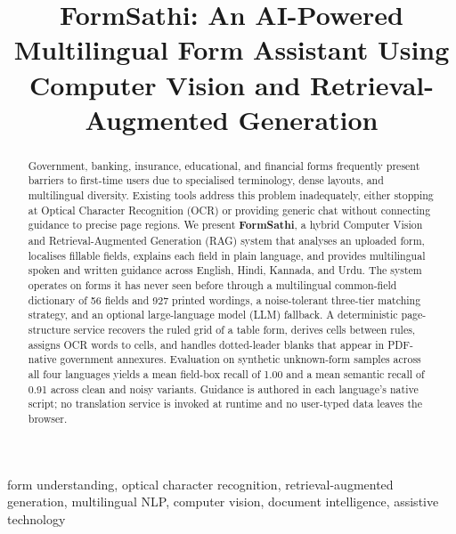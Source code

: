 \documentclass[conference]{IEEEtran}
\begin{document}
\title{FormSathi: An AI-Powered Multilingual Form Assistant Using Computer Vision and Retrieval-Augmented Generation}

\author{
}

\maketitle

\begin{abstract}
Government, banking, insurance, educational, and financial forms frequently present barriers to first-time users due to specialised terminology, dense layouts, and multilingual diversity. Existing tools address this problem inadequately, either stopping at Optical Character Recognition (OCR) or providing generic chat without connecting guidance to precise page regions. We present \textbf{FormSathi}, a hybrid Computer Vision and Retrieval-Augmented Generation (RAG) system that analyses an uploaded form, localises fillable fields, explains each field in plain language, and provides multilingual spoken and written guidance across English, Hindi, Kannada, and Urdu. The system operates on forms it has never seen before through a multilingual common-field dictionary of 56 fields and 927 printed wordings, a noise-tolerant three-tier matching strategy, and an optional large-language model (LLM) fallback. A deterministic page-structure service recovers the ruled grid of a table form, derives cells between rules, assigns OCR words to cells, and handles dotted-leader blanks that appear in PDF-native government annexures. Evaluation on synthetic unknown-form samples across all four languages yields a mean field-box recall of 1.00 and a mean semantic recall of 0.91 across clean and noisy variants. Guidance is authored in each language's native script; no translation service is invoked at runtime and no user-typed data leaves the browser.
\end{abstract}

\begin{IEEEkeywords}
form understanding, optical character recognition, retrieval-augmented generation, multilingual NLP, computer vision, document intelligence, assistive technology
\end{IEEEkeywords}
\end{document}
